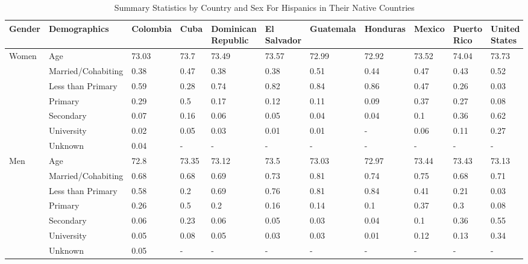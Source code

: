 \documentclass[
]{article}
\begin{document}
\begin{landscape}
\begin{table}[ht]
\centering
\caption{Summary Statistics by Country and Sex For Hispanics in Their Native Countries} 

\begingroup\small
\begin{tabular}{l|l|lllllllll}
  \hline
Gender & Demographics & Colombia & Cuba & Dominican Republic & El Salvador & Guatemala & Honduras & Mexico & Puerto Rico & United States \\ 
  \hline
Women & Age & 73.03 & 73.7 & 73.49 & 73.57 & 72.99 & 72.92 & 73.52 & 74.04 & 73.73 \\ 
   & Married/Cohabiting & 0.38 & 0.47 & 0.38 & 0.38 & 0.51 & 0.44 & 0.47 & 0.43 & 0.52 \\ 
   & Less than Primary & 0.59 & 0.28 & 0.74 & 0.82 & 0.84 & 0.86 & 0.47 & 0.26 & 0.03 \\ 
   & Primary & 0.29 & 0.5 & 0.17 & 0.12 & 0.11 & 0.09 & 0.37 & 0.27 & 0.08 \\ 
   & Secondary & 0.07 & 0.16 & 0.06 & 0.05 & 0.04 & 0.04 & 0.1 & 0.36 & 0.62 \\ 
   & University & 0.02 & 0.05 & 0.03 & 0.01 & 0.01 & - & 0.06 & 0.11 & 0.27 \\ 
   & Unknown & 0.04 & - & - & - & - & - & - & - & - \\ 
  Men & Age & 72.8 & 73.35 & 73.12 & 73.5 & 73.03 & 72.97 & 73.44 & 73.43 & 73.13 \\ 
   & Married/Cohabiting & 0.68 & 0.68 & 0.69 & 0.73 & 0.81 & 0.74 & 0.75 & 0.68 & 0.71 \\ 
   & Less than Primary & 0.58 & 0.2 & 0.69 & 0.76 & 0.81 & 0.84 & 0.41 & 0.21 & 0.03 \\ 
   & Primary & 0.26 & 0.5 & 0.2 & 0.16 & 0.14 & 0.1 & 0.37 & 0.3 & 0.08 \\ 
   & Secondary & 0.06 & 0.23 & 0.06 & 0.05 & 0.03 & 0.04 & 0.1 & 0.36 & 0.55 \\ 
   & University & 0.05 & 0.08 & 0.05 & 0.03 & 0.03 & 0.01 & 0.12 & 0.13 & 0.34 \\ 
   & Unknown & 0.05 & - & - & - & - & - & - & - & - \\ 
   \hline
\end{tabular}
\endgroup
\end{table}



\end{landscape}
\end{document}
